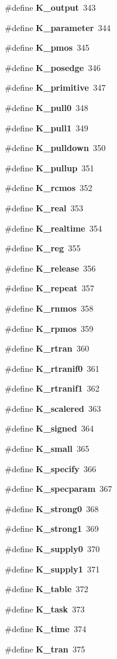 \begin{CompactItemize}
\item 
\#define {\bf K\_\-output}\ 343
\item 
\#define {\bf K\_\-parameter}\ 344
\item 
\#define {\bf K\_\-pmos}\ 345
\item 
\#define {\bf K\_\-posedge}\ 346
\item 
\#define {\bf K\_\-primitive}\ 347
\item 
\#define {\bf K\_\-pull0}\ 348
\item 
\#define {\bf K\_\-pull1}\ 349
\item 
\#define {\bf K\_\-pulldown}\ 350
\item 
\#define {\bf K\_\-pullup}\ 351
\item 
\#define {\bf K\_\-rcmos}\ 352
\item 
\#define {\bf K\_\-real}\ 353
\item 
\#define {\bf K\_\-realtime}\ 354
\item 
\#define {\bf K\_\-reg}\ 355
\item 
\#define {\bf K\_\-release}\ 356
\item 
\#define {\bf K\_\-repeat}\ 357
\item 
\#define {\bf K\_\-rnmos}\ 358
\item 
\#define {\bf K\_\-rpmos}\ 359
\item 
\#define {\bf K\_\-rtran}\ 360
\item 
\#define {\bf K\_\-rtranif0}\ 361
\item 
\#define {\bf K\_\-rtranif1}\ 362
\item 
\#define {\bf K\_\-scalered}\ 363
\item 
\#define {\bf K\_\-signed}\ 364
\item 
\#define {\bf K\_\-small}\ 365
\item 
\#define {\bf K\_\-specify}\ 366
\item 
\#define {\bf K\_\-specparam}\ 367
\item 
\#define {\bf K\_\-strong0}\ 368
\item 
\#define {\bf K\_\-strong1}\ 369
\item 
\#define {\bf K\_\-supply0}\ 370
\item 
\#define {\bf K\_\-supply1}\ 371
\item 
\#define {\bf K\_\-table}\ 372
\item 
\#define {\bf K\_\-task}\ 373
\item 
\#define {\bf K\_\-time}\ 374
\item 
\#define {\bf K\_\-tran}\ 375

\end{CompactItemize}
